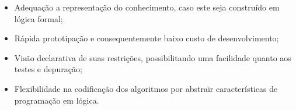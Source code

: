 \documentclass[12pt]{article}
\theoremstyle{definition}
\begin{document}
\begin{itemize}
\item Adequação a representação do conhecimento, caso este seja construído em lógica formal;
\item Rápida prototipação e consequentemente baixo custo de desenvolvimento;
\item Visão declarativa de suas restrições, possibilitando uma facilidade quanto aos testes e depuração;
\item Flexibilidade na codificação dos algoritmos por abstrair características de programação em lógica.
\end{itemize}
\begin{comment}
Contudo, a Programação em Lógica com Restrições é resultado da utilização do paradigma da programação em lógica somado à programação por restrições. A PLR está contida no subconjunto de técnicas que fazem uso da PL para resolver problemas do tipo PSR. As vantagens de se utilizar a programação em lógica por restrições (PLR) estão em: modelar problemas de forma declarativa com uma sólida base matemática, propagação dos efeitos das decisões utilizando algoritmos eficientes e busca por soluções ótimas \cite{FRUHWIRTH_03}. Desde o início dos anos 90, a programação baseada em restrições tem tido sucesso comercial e industrial \cite{russel_2010}. Em 1996, o mundo gerou, utilizando tecnologia de restrições um valor estimado de 100 milhões de dólares \cite{FRUHWIRTH_03}.

A PLR surgiu inicialmente contido no contexto da programação lógica, apesar de atualmente existirem implementações baseadas em programação funcional e programação imperativa.


De forma geral, as restrições são implementadas como uma extensão de uma linguagem já existente. Estas, operam sobre domínios específicos, sendo os mais usuais os seguintes:
\begin{itemize}
\setlength{\itemsep}{-2pt}
\item Booleanos
\item Números inteiros e racionais
\item Lineares
\item Finitos
\item Mistos
\end{itemize}
Apesar dos vários domínios disponíveis, o mais usado atualmente é o domínio finito inteiro, devido principalmente à sua versatilidade. Na prática, o interpretador cria inicialmente o domínio para cada variável do problema e vai restringindo cada domínio à medida que avalia cada restrição. No fim deste processo, obter-se-á uma ou várias soluções que satisfaçam as restrições, ou caso estas não sejam satisfazíveis, nenhuma solução é encontrada.  A utilização dessa forma de restrições reduz o espaço de busca. Assim, o ganho com PLR é obtido pela redução do espaço de busca, conseqüentemente o tempo de busca se reduz drasticamente \cite{apt_2003}.
\end{comment}
\end{document}
